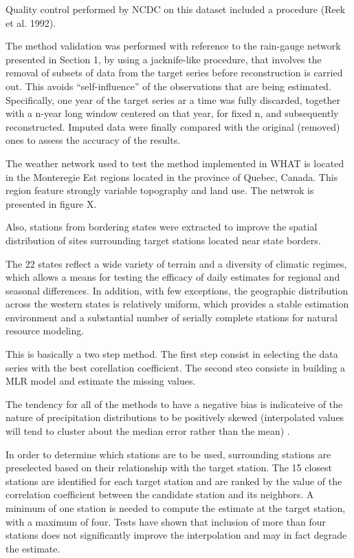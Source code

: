 \documentclass[WHATMANUAL.tex]{subfiles}
\begin{document}
Quality control performed by NCDC on this dataset included a procedure (Reek et al. 1992).

The method validation was performed with reference to the rain-gauge network presented in Section 1, by using a jacknife-like procedure, that involves the removal of subsets of data from the target series before reconstruction is carried out. This avoids ``self-influence'' of the observations that are being estimated. Specifically, one year of the target series ar a time was fully discarded, together with a n-year long window centered on that year, for fixed n, and subsequently reconstructed. Imputed data were finally compared with the original (removed) ones to assess the accuracy of the results.

The weather network used to test the method implemented in WHAT is located in the Monteregie Est regions located in the province of Quebec, Canada. This region feature strongly variable topography and land use. The netwrok is presented in figure X.

Also, stations from bordering states were extracted to improve the spatial distribution of sites surrounding target stations located near state borders.

The 22 states reflect a wide variety of terrain and a diversity of climatic regimes, which allows a means for testing the efficacy of daily estimates for regional and seasonal differences. In addition, with few exceptions, the geographic distribution across the western states is relatively uniform, which provides a stable estimation environment and a substantial number of serially complete stations for natural resource modeling.

This is basically a two step method. The first step consist in selecting the data series with the best corellation coefficient. The second steo consiste in building a MLR model and estimate the missing values.

The tendency for all of the methods to have a negative bias is indicateive of the nature of precipitation distributions to be positively skewed (interpolated values will tend to cluster about the median error rather than the mean) \citep{eischeid_quality_1995}.

In order to determine which stations are to be used, surrounding stations are preselected based on their relationship with the target station. The 15 closest stations are identified for each target station and are ranked by the value of the correlation coefficient between the candidate station and its neighbors. A minimum of one station is needed to compute the estimate at the target station, with a maximum of four. Tests have shown that inclusion of more than four stations does not significantly improve the interpolation and may in fact degrade the estimate.
\end{document}
